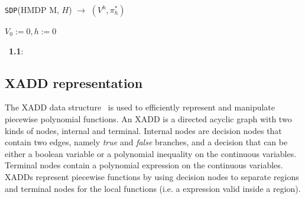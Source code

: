 \vspace{-2mm}
\begin{algorithm}[ht!]
\small
\DontPrintSemicolon
\caption{\texttt{SDP}(HMDP M, $H$) $\rightarrow$ $(V^h,\pi^*_h)$ ~\cite{zamani12}\label{alg:sdp}}
	$V_0:=0, h:=0$\;
	 \;
\vspace{3mm}

\setcounter{AlgoLine}{0}
\myproc~{\bf 1.1}:~
\end{algorithm}
\vspace{-5mm}

\subsection{XADD representation}

The XADD data structure~\cite{sanner11} is used to efficiently represent and manipulate piecewise polynomial functions.
An XADD is a directed acyclic graph with two kinds of nodes, internal and terminal. Internal nodes are decision nodes that contain two edges, namely \emph{true} and \emph{false} branches, and a decision that can be either a boolean variable or a polynomial inequality on the continuous variables.
Terminal nodes contain a polynomial expression on the continuous variables.
XADDs represent piecewise functions by using decision nodes to separate regions and terminal nodes for the local functions (i.e. a expression valid inside a region).


